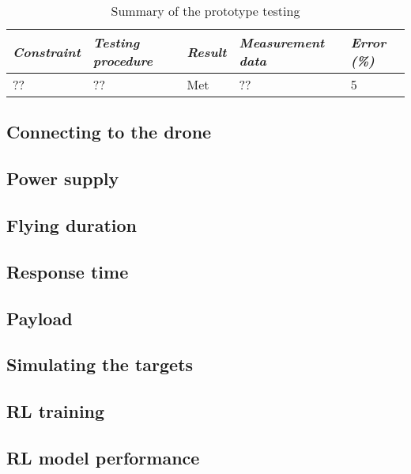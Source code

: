 \documentclass[../main.tex]{subfiles}
\begin{document}
\begin{table}[H]
    \centering
    \caption{Summary of the prototype testing}
    \label{tab:testing-summary}
    \begin{tabularx}{\textwidth}{ l X l l l }
        \toprule
        \textit{Constraint} 
            & \textit{Testing procedure} 
                & \textit{Result}
        & \textit{Measurement data} 
            & \textit{Error (\%)} \\

        \midrule
        
        
        ??    & ?? 
        & Met
            & ??
        & 5 \\

        \bottomrule		
    \end{tabularx}
\end{table}


\subsection{Connecting to the drone}

\lipsum[1]

\subsection{Power supply}

\lipsum[1]

\subsection{Flying duration}

\lipsum[1]

\subsection{Response time}

\lipsum[1]

\subsection{Payload}

\lipsum[1]

\subsection{Simulating the targets}

\lipsum[1]

\subsection{RL training}

\lipsum[1]

\subsection{RL model performance}

\lipsum[1]
\end{document}
